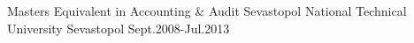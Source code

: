 


\begin{cventries}


\cventry
{Master\’s Equivalent in Accounting & Audit} %
{Sevastopol National Technical University} %
{Sevastopol} %
{Sept.2008-Jul.2013} %
{ %
}



\end{cventries}